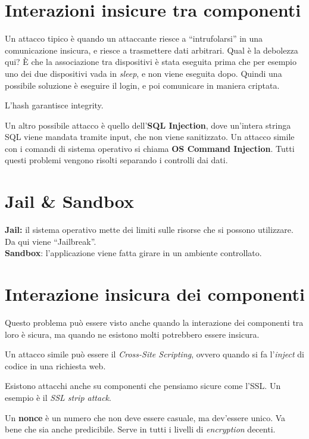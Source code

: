\section{Interazioni insicure tra componenti}

Un attacco tipico è quando un attaccante riesce a ``intrufolarsi'' in una
comunicazione insicura, e riesce a trasmettere dati arbitrari.
Qual è la debolezza qui? È che la associazione tra dispositivi è stata eseguita
prima che per esempio uno dei due dispositivi vada in \textit{sleep}, e non
viene eseguita dopo. Quindi una possibile soluzione è eseguire il login, e poi
comunicare in maniera criptata.

L'hash garantisce integrity.

Un altro possibile attacco è quello dell'\textbf{SQL Injection}, dove un'intera
stringa SQL viene mandata tramite input, che non viene sanitizzato. Un attacco
simile con i comandi di sistema operativo si chiama \textbf{OS Command
Injection}. Tutti questi problemi vengono risolti separando i controlli dai
dati.

\section{Jail \& Sandbox}

\textbf{Jail:} il sistema operativo mette dei limiti sulle risorse che si
possono utilizzare.
Da qui viene ``Jailbreak''.\\
\newline
\textbf{Sandbox}: l'applicazione viene fatta girare in un ambiente controllato.


\section{Interazione insicura dei componenti}

Questo problema può essere visto anche quando la interazione dei componenti tra
loro è sicura, ma quando ne esistono molti potrebbero essere insicura.

Un attacco simile può essere il \textit{Cross-Site Scripting}, ovvero quando si
fa l'\textit{inject} di codice in una richiesta web.


Esistono attacchi anche su componenti che pensiamo sicure come l'SSL. Un
esempio è il \textit{SSL strip attack}.

Un \textbf{nonce} è un numero che non deve essere casuale, ma dev'essere unico.
Va bene che sia anche predicibile. Serve in tutti i livelli di
\textit{encryption} decenti.
